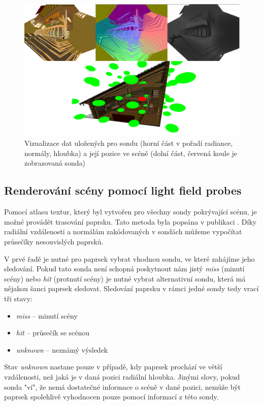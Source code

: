 \begin{figure}[H]
	\centering
	\includegraphics[scale=1]{images/probe_with_scene.png}
	\caption{Vizualizace dat uložených pro sondu (horní část v pořadí radiance, normály, hloubka) a její pozice ve scéně (dolní část, červená koule je zobrazovaná sonda)}
	\label{fig:probe_in_scene}
\end{figure}

\subsection{Renderování scény pomocí light field probes}
Pomocí atlasu textur, který byl vytvořen pro všechny sondy pokrývající scénu, je možné provádět trasování paprsku. Tato metoda byla popsána v publikaci \cite{light_field_probes}. Díky radiální vzdálenosti a normálám zakódovaných v sondách můžeme vypočítat průsečíky nesouvislých paprsků. 

V prvé řadě je nutné pro paprsek vybrat vhodnou sondu, ve které zahájíme jeho sledování. Pokud tato sonda není schopná poskytnout nám jistý \textit{miss} (minutí scény) nebo \textit{hit} (protnutí scény) je nutné vybrat alternativní sondu, která má nějakou šanci paprsek sledovat. Sledování paprsku v rámci jedné sondy tedy vrací tři stavy:
\begin{itemize}
    \item \textit{miss} -- minutí scény
    \item \textit{hit} -- průsečík se scénou
    \item \textit{unknown} -- neznámý výsledek
\end{itemize}

Stav \textit{unknown} nastane pouze v případě, kdy paprsek prochází ve větší vzdálenosti, než jaká je v daná pozici radiální hloubka. Jinými slovy, pokud sonda "ví", že nemá dostatečné informace o scéně v dané pozici, nemůže být paprsek spolehlivě vyhodnocen pouze pomocí informací z této sondy. 

